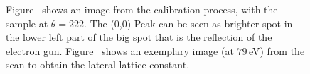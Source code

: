 \documentclass[a4paper,10pt]{scrartcl}
\begin{document}
\begin{figure}
\centering
{}
\caption{ Figure~ shows an image from the calibration process, with the sample at $\theta = 222$\textdegree. The (0,0)-Peak can be seen as brighter spot in the lower left part of the big spot that is the reflection of the electron gun. Figure~ shows an exemplary image (at $79\,$eV) from the scan to obtain the lateral lattice constant.}
\end{figure}
\end{document}
